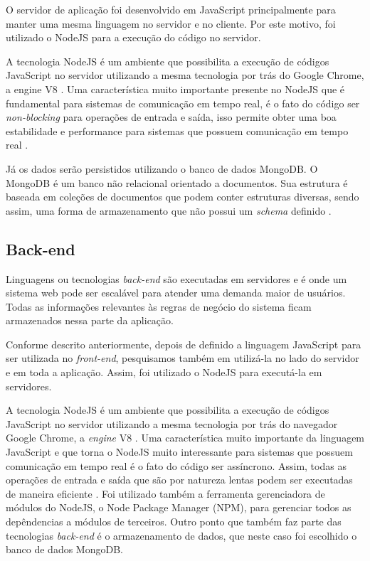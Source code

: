 O servidor de aplicação foi desenvolvido em JavaScript principalmente para manter uma mesma linguagem no servidor e no cliente. Por este motivo, foi utilizado o NodeJS para a execução do código no servidor.

A tecnologia NodeJS é um ambiente que possibilita a execução de códigos JavaScript no servidor utilizando a mesma tecnologia por trás do Google Chrome, a engine V8 \cite{nodejs}. Uma característica muito importante presente no NodeJS que é fundamental para sistemas de comunicação em tempo real, é o fato do código ser \emph{non-blocking} para operações de entrada e saída, isso permite obter uma boa estabilidade e performance para sistemas que possuem comunicação em tempo real \cite{nodejs}.

Já os dados serão persistidos utilizando o banco de dados MongoDB. O MongoDB é um banco não relacional orientado a documentos. Sua estrutura é baseada em coleções de documentos que podem conter estruturas diversas, sendo assim, uma forma de armazenamento que não possui um \emph{schema} definido \cite{mongodb}. 

\fi

\subsection{Back-end}
\label{sec:tecnologias_backend}

Linguagens ou tecnologias \emph{back-end} são executadas em servidores e é onde um sistema web pode ser escalável para atender uma demanda maior de usuários. Todas as informações relevantes às regras de negócio do sistema ficam armazenados nessa parte da aplicação.

Conforme descrito anteriormente, depois de definido a linguagem JavaScript para ser utilizada no \emph{front-end}, pesquisamos também em utilizá-la no lado do servidor e em toda a aplicação. Assim, foi utilizado o NodeJS para executá-la em servidores.

A tecnologia NodeJS é um ambiente que possibilita a execução de códigos JavaScript no servidor utilizando a mesma tecnologia por trás do navegador Google Chrome, a \emph{engine} V8 \cite{nodejs}. Uma característica muito importante da linguagem JavaScript e que torna o NodeJS muito interessante para sistemas que possuem comunicação em tempo real é o fato do código ser assíncrono. Assim, todas as operações de entrada e saída que são por natureza lentas podem ser executadas de maneira eficiente \cite{nodejs}. Foi utilizado também a ferramenta gerenciadora de módulos do NodeJS, o Node Package Manager (NPM), para gerenciar todos as depêndencias a módulos de terceiros. Outro ponto que também faz parte das tecnologias \emph{back-end} é o armazenamento de dados, que neste caso foi escolhido o banco de dados MongoDB.

